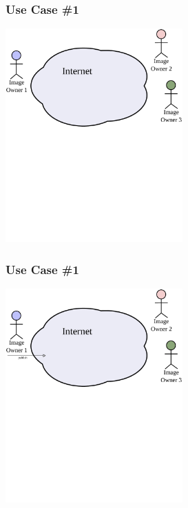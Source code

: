 \documentclass[mathserif,xcolor=dvipsnames,hyperref={bookmarks=true}]{beamer}
\begin{document}
    \begin{frame}[t]
        \frametitle{Use Case \#1}
        \begin{center}
            \includegraphics[width=0.51\textwidth]{../resources/usecases/usecase1/usecase1-step04.pdf}
        \end{center}
    \end{frame}
    \begin{frame}[t]
        \frametitle{Use Case \#1}
        \begin{center}
            \includegraphics[width=0.51\textwidth]{../resources/usecases/usecase1/usecase1-step05.pdf}
        \end{center}
    \end{frame}
\end{document}
